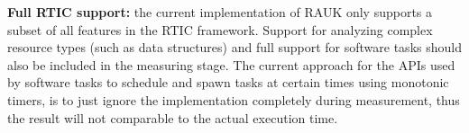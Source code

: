\textbf{Full RTIC support:} the current implementation of RAUK only supports
a subset of all features in the RTIC framework. Support for analyzing complex
resource types (such as data structures) and full support for software tasks
should also be included in the measuring stage. The current approach for the APIs
used by software tasks to schedule and spawn tasks at certain times using
monotonic timers, is to just ignore the implementation completely during
measurement, thus the result will not comparable to the actual execution time.

